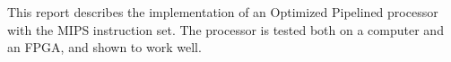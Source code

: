 This report describes the implementation of an Optimized Pipelined processor
with the MIPS instruction set. The processor is tested both on a computer and an
FPGA, and shown to work well.

